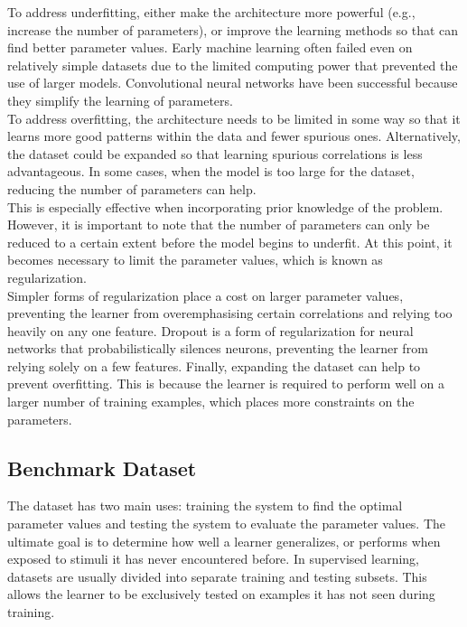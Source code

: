 \noindent To address underfitting, either make the architecture more powerful (e.g., increase the number of parameters), or improve the learning methods so that can find better parameter values. Early machine learning often failed even on relatively simple datasets due to the limited computing power that prevented the use of larger models. Convolutional neural networks have been successful because they simplify the learning of parameters. \\

\noindent To address overfitting, the architecture needs to be limited in some way so that it learns more good patterns within the data and fewer spurious ones. Alternatively, the dataset could be expanded so that learning spurious correlations is less advantageous. In some cases, when the model is too large for the dataset, reducing the number of parameters can help. \\

\noindent This is especially effective when incorporating prior knowledge of the problem. However, it is important to note that the number of parameters can only be reduced to a certain extent before the model begins to underfit. At this point, it becomes necessary to limit the parameter values, which is known as regularization. \\

\noindent Simpler forms of regularization place a cost on larger parameter values, preventing the learner from overemphasising certain correlations and relying too heavily on any one feature. Dropout is a form of regularization for neural networks that probabilistically silences neurons, preventing the learner from relying solely on a few features. Finally, expanding the dataset can help to prevent overfitting. This is because the learner is required to perform well on a larger number of training examples, which places more constraints on the parameters. 

\subsection[Benchmark Dataset]{Benchmark Dataset}

The dataset has two main uses: training the system to find the optimal parameter values and testing the system to evaluate the parameter values. The ultimate goal is to determine how well a learner generalizes, or performs when exposed to stimuli it has never encountered before. In supervised learning, datasets are usually divided into separate training and testing subsets. This allows the learner to be exclusively tested on examples it has not seen during training. \\

